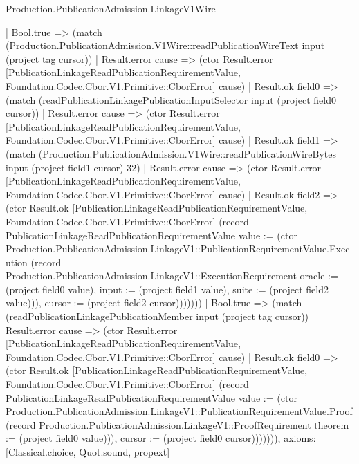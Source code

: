 \begin{lexlean}{Production.PublicationAdmission.LinkageV1Wire}
\begin{semanticmodule}
{          | Bool.true => (match (Production.PublicationAdmission.V1Wire::readPublicationWireText input (project tag cursor))
            | Result.error cause => (ctor Result.error [PublicationLinkageReadPublicationRequirementValue, Foundation.Codec.Cbor.V1.Primitive::CborError] cause)
            | Result.ok field0 => (match (readPublicationLinkagePublicationInputSelector input (project field0 cursor))
              | Result.error cause => (ctor Result.error [PublicationLinkageReadPublicationRequirementValue, Foundation.Codec.Cbor.V1.Primitive::CborError] cause)
              | Result.ok field1 => (match (Production.PublicationAdmission.V1Wire::readPublicationWireBytes input (project field1 cursor) 32)
                | Result.error cause => (ctor Result.error [PublicationLinkageReadPublicationRequirementValue, Foundation.Codec.Cbor.V1.Primitive::CborError] cause)
                | Result.ok field2 => (ctor Result.ok [PublicationLinkageReadPublicationRequirementValue, Foundation.Codec.Cbor.V1.Primitive::CborError] (record PublicationLinkageReadPublicationRequirementValue {value := (ctor Production.PublicationAdmission.LinkageV1::PublicationRequirementValue.Execution (record Production.PublicationAdmission.LinkageV1::ExecutionRequirement {oracle := (project field0 value), input := (project field1 value), suite := (project field2 value)})), cursor := (project field2 cursor)}))))))
        | Bool.true => (match (readPublicationLinkagePublicationMember input (project tag cursor))
          | Result.error cause => (ctor Result.error [PublicationLinkageReadPublicationRequirementValue, Foundation.Codec.Cbor.V1.Primitive::CborError] cause)
          | Result.ok field0 => (ctor Result.ok [PublicationLinkageReadPublicationRequirementValue, Foundation.Codec.Cbor.V1.Primitive::CborError] (record PublicationLinkageReadPublicationRequirementValue {value := (ctor Production.PublicationAdmission.LinkageV1::PublicationRequirementValue.Proof (record Production.PublicationAdmission.LinkageV1::ProofRequirement {theorem := (project field0 value)})), cursor := (project field0 cursor)})))))),
  axioms: [Classical.choice, Quot.sound, propext]
}


\end{semanticmodule}
\end{lexlean}
